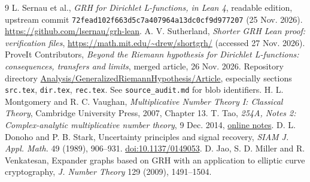 \documentclass[11pt]{article}
\theoremstyle{remark}\newtheorem{remark}[theorem]{Remark}
\begin{document}
\begin{thebibliography}{9}
 L. Sernau et al., \emph{GRH for Dirichlet L-functions, in Lean 4}, readable edition, upstream commit \texttt{72fead102f663d5c7a407964a13dc0cf9d977207} (25 Nov. 2026). \url{https://github.com/lsernau/grh-lean}.
 A. V. Sutherland, \emph{Shorter GRH Lean proof: verification files}, \url{https://math.mit.edu/~drew/shortgrh/} (accessed 27 Nov. 2026).
 ProveIt Contributors, \emph{Beyond the Riemann hypothesis for Dirichlet L-functions: consequences, transfers and limits}, merged article, 26 Nov. 2026. Repository directory \href{https://github.com/VladimirReshetnikov/ProveIt/tree/main/Analysis/GeneralizedRiemannHypothesis/Article}{Analysis/GeneralizedRiemannHypothesis/Article}, especially sections \texttt{src.tex}, \texttt{dir.tex}, \texttt{rec.tex}. See \texttt{source\_audit.md} for blob identifiers.
 H. L. Montgomery and R. C. Vaughan, \emph{Multiplicative Number Theory I: Classical Theory}, Cambridge University Press, 2007, Chapter 13.
 T. Tao, \emph{254A, Notes 2: Complex-analytic multiplicative number theory}, 9 Dec. 2014, \href{https://terrytao.wordpress.com/2014/12/09/254a-notes-2-complex-analytic-multiplicative-number-theory/}{online notes}.
 D. L. Donoho and P. B. Stark, Uncertainty principles and signal recovery, \emph{SIAM J. Appl. Math.} 49 (1989), 906--931. \href{https://doi.org/10.1137/0149053}{doi:10.1137/0149053}.
 D. Jao, S. D. Miller and R. Venkatesan, Expander graphs based on GRH with an application to elliptic curve cryptography, \emph{J. Number Theory} 129 (2009), 1491--1504.
\end{thebibliography}
\end{document}
